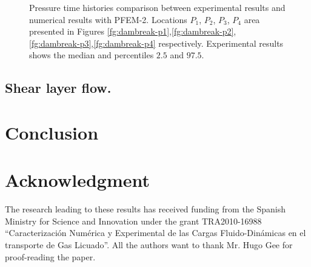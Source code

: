 \documentclass[a4paper,conference]{IEEEtran}
\begin{document}
\begin{figure}[H]
{    }
   \caption{Pressure time histories comparison between experimental results\cite{Lobovsky13} and numerical results with PFEM-2. Locations $P_1$, $P_2$, $P_3$, $P_4$ area presented in Figures \ref{fg:dambreak-p1},\ref{fg:dambreak-p2},\ref{fg:dambreak-p3},\ref{fg:dambreak-p4} respectively. Experimental results shows the median and percentiles $2.5$ and $97.5$.}
   \label{fg:dambreak-p}                %
\end{figure}

\subsection{Shear layer flow.}



\section{Conclusion}



\section*{Acknowledgment}
The research  leading  to these results has received funding from the Spanish Ministry for Science and
 Innovation under the grant TRA2010-16988
``Caracterizaci\'on Num\'erica y Experimental de las Cargas Fluido-Din\'amicas en el transporte de Gas Licuado''.
All the authors want to thank Mr. Hugo Gee for proof-reading the paper.
\end{document}

